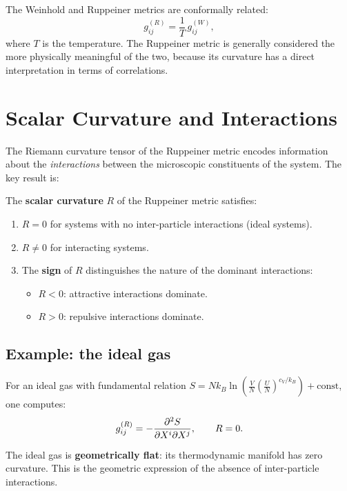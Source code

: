 The Weinhold and Ruppeiner metrics are conformally related:
\begin{equation}
g_{ij}^{(R)} = \frac{1}{T}\,g_{ij}^{(W)},
\end{equation}
where $T$ is the temperature. The Ruppeiner metric is generally considered the more physically meaningful of the two, because its curvature has a direct interpretation in terms of correlations.

\section{Scalar Curvature and Interactions}

The Riemann curvature tensor of the Ruppeiner metric encodes information about the \emph{interactions} between the microscopic constituents of the system. The key result is:

\begin{theorem}
The \textbf{scalar curvature} $R$ of the Ruppeiner metric satisfies:
\begin{enumerate}
\item $R = 0$ for systems with no inter-particle interactions (ideal systems).
\item $R \neq 0$ for interacting systems.
\item The \textbf{sign} of $R$ distinguishes the nature of the dominant interactions:
\begin{itemize}
\item $R < 0$: attractive interactions dominate.
\item $R > 0$: repulsive interactions dominate.
\end{itemize}
\end{enumerate}
\end{theorem}

\subsection{Example: the ideal gas}

For an ideal gas with fundamental relation $S = Nk_B\ln\!\left(\frac{V}{N}\left(\frac{U}{N}\right)^{c_V/k_B}\right) + \text{const}$, one computes:
\begin{equation}
g_{ij}^{(R)} = -\pdv[2]{S}{X^i}{X^j}, \qquad R = 0.
\end{equation}

The ideal gas is \textbf{geometrically flat}: its thermodynamic manifold has zero curvature. This is the geometric expression of the absence of inter-particle interactions.

